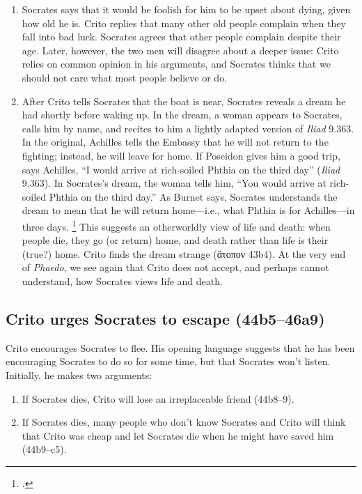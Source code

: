 \documentclass[12pt,letterpaper]{article}
\begin{document}
\begin{enumerate}
        \footcite[][197]{brickhouse-smith2004-plato-trial-of-socrates}
    \item Socrates says that it would be foolish for him to be upset about dying, given how old he is.
        Crito replies that many other old people complain when they fall into bad luck.
        Socrates agrees that other people complain despite their age.
        Later, however, the two men will disagree about a deeper issue: Crito relies on common opinion in his arguments, and Socrates thinks that we should not care what most people believe or do.
    \item After Crito tells Socrates that the boat is near, Socrates reveals a dream he had shortly before waking up.
        In the dream, a woman appears to Socrates, calls him by name, and recites to him a lightly adapted version of \textit{Iliad} 9.363.
        In the original, Achilles tells the Embassy that he will not return to the fighting; instead, he will leave for home.
        If Poseidon gives him a good trip, says Achilles, ``I would arrive at rich-soiled Phthia on the third day'' (\textit{Iliad} 9.363).
        In Socrates's dream, the woman tells him, ``You would arrive at rich-soiled Phthia on the third day.''
        As Burnet says, Socrates understands the dream to mean that he will return home---i.e., what Phthia is for Achilles---in three days.%
        \footcite[][on 44b2]{burnet1924-euthyphro-apology-crito} This suggests an otherworldly view of life and death: when people die, they go (or return) home, and death rather than life is their (true?) home.
        Crito finds the dream strange (\textgreek{ἄτοπον} 43b4).
        At the very end of \textit{Phaedo}, we see again that Crito does not accept, and perhaps cannot understand, how Socrates views life and death.

\end{enumerate}


\subsection*{Crito urges Socrates to escape (44b5--46a9)}

Crito encourages Socrates to flee.
His opening language suggests that he has been encouraging Socrates to do so for some time, but that Socrates won't listen.
Initially, he makes two arguments:

\begin{enumerate}

    \item If Socrates dies, Crito will lose an irreplaceable friend (44b8--9).

    \item If Socrates dies, many people who don't know Socrates and Crito will think that Crito was cheap and let Socrates die when he might have saved him (44b9--c5).

\end{enumerate}
\end{document}
